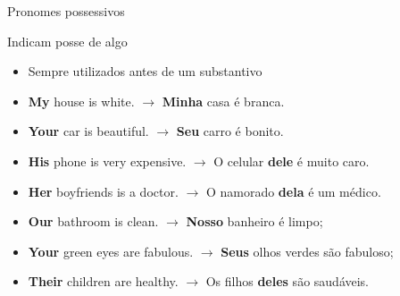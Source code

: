 \documentclass[compress,mathserif,xcolor=table]{beamer}
\begin{document}
\begin{frame}{Pronomes possessivos}

Indicam posse de algo
\begin{itemize}
    \item Sempre utilizados antes de um substantivo
\end{itemize}

\vspace{0.5cm}

\begin{itemize}
    \item \textbf{My} house is white. $\rightarrow$ \textbf{Minha} casa é branca.
    \item \textbf{Your} car is beautiful. $\rightarrow$ \textbf{Seu} carro é bonito.
    \item \textbf{His} phone is very expensive. $\rightarrow$ O celular \textbf{dele} é muito caro.
    \item \textbf{Her} boyfriends is a doctor. $\rightarrow$ O namorado \textbf{dela} é um médico.
    \item \textbf{Our} bathroom is clean. $\rightarrow$ \textbf{Nosso} banheiro é limpo;
    \item \textbf{Your} green eyes are fabulous. $\rightarrow$ \textbf{Seus} olhos verdes são fabuloso;
    \item \textbf{Their} children are healthy. $\rightarrow$ Os filhos \textbf{deles} são saudáveis.
\end{itemize}
\end{frame}

\end{document}

